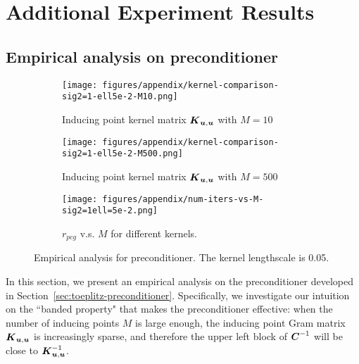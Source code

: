 \section{Additional Experiment Results}

\subsection{Empirical analysis on preconditioner}

\begin{figure}[t!]
\centering
\begin{subfigure}{0.8\columnwidth}
  \texttt{[image: figures/appendix/kernel-comparison-sig2=1-ell5e-2-M10.png]}
  \caption{Inducing point kernel matrix $\boldsymbol{K}_{\boldsymbol{u}, \boldsymbol{u}}$ with $M=10$}
	\label{fig:ell5e-2-M10}
  \vspace{0.25cm}
\end{subfigure}
\begin{subfigure}{0.8\columnwidth}
  \texttt{[image: figures/appendix/kernel-comparison-sig2=1-ell5e-2-M500.png]}
  \caption{Inducing point kernel matrix $\boldsymbol{K}_{\boldsymbol{u}, \boldsymbol{u}}$ with $M=500$}
	\label{fig:ell5e-2-M500}
  \vspace{0.25cm}
\end{subfigure}
\begin{subfigure}{0.8\columnwidth}
  \texttt{[image: figures/appendix/num-iters-vs-M-sig2=1ell=5e-2.png]}
  \caption{$r_{pcg}$ v.s. $M$ for different kernels. }
	\label{fig:ell5e-2-convergence}
  \vspace{0.25cm}
\end{subfigure}
\caption{Empirical analysis for preconditioner. The kernel lengthscale is 0.05. }
\label{fig:preconditioner-ell=5e-2}
\end{figure}

In this section, we present an empirical analysis on the preconditioner developed in Section~\ref{sec:toeplitz-preconditioner}.
Specifically, we investigate our intuition
on the ``banded property" that makes the preconditioner effective:
when the number of inducing points $M$ is large enough,
the inducing point Gram matrix $\boldsymbol{K}_{\boldsymbol{u}, \boldsymbol{u}}$ is increasingly sparse,
and therefore the upper left block of $\boldsymbol{C}^{-1}$ will be close to $\boldsymbol{K}_{\boldsymbol{u}, \boldsymbol{u}}^{-1}$.

